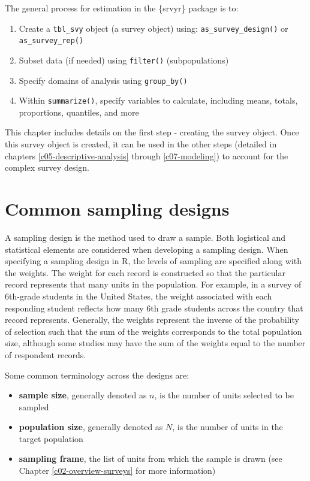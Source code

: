 \documentclass[
]{krantz}
\providecommand{\tightlist}{%
  \setlength{\itemsep}{0pt}\setlength{\parskip}{0pt}}
\begin{document}
The general process for estimation in the \{srvyr\} package is to:

\begin{enumerate}
\def\labelenumi{\arabic{enumi}.}
\item
  Create a \texttt{tbl\_svy} object (a survey object) using: \texttt{as\_survey\_design()} or \texttt{as\_survey\_rep()}
\item
  Subset data (if needed) using \texttt{filter()} (subpopulations)
\item
  Specify domains of analysis using \texttt{group\_by()}
\item
  Within \texttt{summarize()}, specify variables to calculate, including means, totals, proportions, quantiles, and more
\end{enumerate}

This chapter includes details on the first step - creating the survey object. Once this survey object is created, it can be used in the other steps (detailed in chapters \ref{c05-descriptive-analysis} through \ref{c07-modeling}) to account for the complex survey design.

\hypertarget{common-sampling-designs}{%
\section{Common sampling designs}\label{common-sampling-designs}}

A sampling design is the method used to draw a sample. Both logistical and statistical elements are considered when developing a sampling design. When specifying a sampling design in R, the levels of sampling are specified along with the weights. The weight for each record is constructed so that the particular record represents that many units in the population. For example, in a survey of 6th-grade students in the United States, the weight associated with each responding student reflects how many 6th grade students across the country that record represents. Generally, the weights represent the inverse of the probability of selection such that the sum of the weights corresponds to the total population size, although some studies may have the sum of the weights equal to the number of respondent records.

Some common terminology across the designs are:

\begin{itemize}
\tightlist
\item
  \textbf{sample size}, generally denoted as \(n\), is the number of units selected to be sampled
\item
  \textbf{population size}, generally denoted as \(N\), is the number of units in the target population
\item
  \textbf{sampling frame}, the list of units from which the sample is drawn (see Chapter \ref{c02-overview-surveys} for more information)
\end{itemize}
\end{document}
